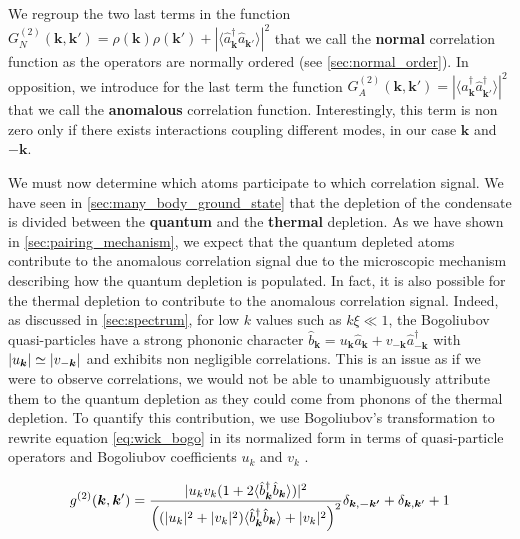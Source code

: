 \noindent We regroup the two last terms in the function $G^{(2)}_{N}({\bm k},{\bm k}')= \rho({\bm k})\rho({\bm k}') + | \langle \hat{a}^{\dagger}_{\bm k} \hat{a}_{\bm {k}'} \rangle |^2$ that we call the \textbf{normal} correlation function as the operators are normally ordered (see \ref{sec:normal_order}). In opposition, we introduce for the last term the function $G^{(2)}_{A}({\bm k},{\bm k}')=| \langle \hat{a}^{\dagger}_{\bm k} \hat{a}^{\dagger}_{\bm {k}'} \rangle |^2 $ that we call the \textbf{anomalous} correlation function. Interestingly, this term is non zero only if there exists interactions coupling different modes, in our case $\bm{k}$ and $-\bm{k}$.

We must now determine which atoms participate to which correlation signal. We have seen in \ref{sec:many_body_ground_state} that the depletion of the condensate is divided between the \textbf{quantum} and the \textbf{thermal} depletion. As we have shown in \ref{sec:pairing_mechanism}, we expect that the quantum depleted atoms contribute to the anomalous \kmk correlation signal due to the microscopic mechanism describing how the quantum depletion is populated. In fact, it is also possible for the thermal depletion to contribute to the anomalous correlation signal. Indeed, as discussed in \ref{sec:spectrum}, for low $k$ values such as $k \xi \ll 1$, the Bogoliubov quasi-particles have a strong phononic character $\hat{b}_{\bm{k}}=u_{\bm{k}} \hat{a}_{\bm{k}} + v_{-\bm{k}} \hat{a}^{\dagger}_{-\bm{k}}$ with $\left\lvert u_{\bm{k}}\right\rvert \simeq \left\lvert v_{-\bm{k}}\right\rvert$ and exhibits non negligible \kmk correlations. This is an issue as if we were to observe \kmk correlations, we would not be able to unambiguously attribute them to the quantum depletion as they could come from phonons of the thermal depletion. To quantify this contribution, we use Bogoliubov's transformation to rewrite equation \ref{eq:wick_bogo} in its normalized form in terms of quasi-particle operators and Bogoliubov coefficients $u_k$ and $v_k$ \cite{butera2020,mathey2009noise}.

\begin{equation}
    g^{(2)} (\bm{k},\bm{k}') = \frac{| u_k v_k (1+2\langle \hat{b}^{\dagger}_{\bm{k}} \hat{b}_{\bm{k}} \rangle)| ^2 }{\Big((|u_k|^2+|v_k|^2)\langle \hat{b}^{\dagger}_{\bm{k}}  \hat{b}_{\bm{k}} \rangle + |v_k|^2 \Big)^2} \delta_{\bm{k},\bm{-k'}}+ \delta_{\bm{k},\bm{k}'} + 1
    \label{eq:g2_uv}
\end{equation}




